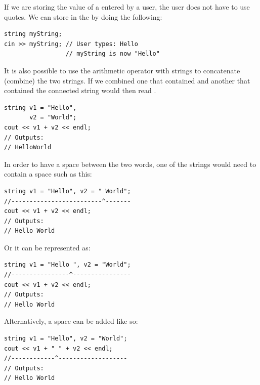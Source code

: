 If we are storing the value of a  entered by a user, the user does not have to use quotes.
We can store  in the  by doing the following:

\noindent\begin{minipage}{\linewidth}\begin{lstlisting}
string myString;
cin >> myString; // User types: Hello
                 // myString is now "Hello"
\end{lstlisting}\end{minipage}

\noindent It is also possible to use the arithmetic operator \Code{+} with strings to concatenate (combine) the two strings.
If we combined one  that contained  and another  that contained  the connected string would then read .

\noindent\begin{minipage}{\linewidth}\begin{lstlisting}
string v1 = "Hello",
       v2 = "World";
cout << v1 + v2 << endl;
// Outputs:
// HelloWorld
\end{lstlisting}\end{minipage}

\noindent In order to have a space between the two words, one of the strings would need to contain a space such as this:

\noindent\begin{minipage}{\linewidth}\begin{lstlisting}
string v1 = "Hello", v2 = " World";
//-------------------------^-------
cout << v1 + v2 << endl;
// Outputs:
// Hello World
\end{lstlisting}\end{minipage}

\noindent Or it can be represented as: 

\noindent\begin{minipage}{\linewidth}\begin{lstlisting}
string v1 = "Hello ", v2 = "World";
//----------------^----------------
cout << v1 + v2 << endl;
// Outputs:
// Hello World
\end{lstlisting}\end{minipage}

\noindent Alternatively, a space can be added like so: \nopagebreak[4]

\noindent\begin{minipage}{\linewidth}\begin{lstlisting}
string v1 = "Hello", v2 = "World";
cout << v1 + " " + v2 << endl;
//------------^-------------------
// Outputs:
// Hello World
\end{lstlisting}\end{minipage}

